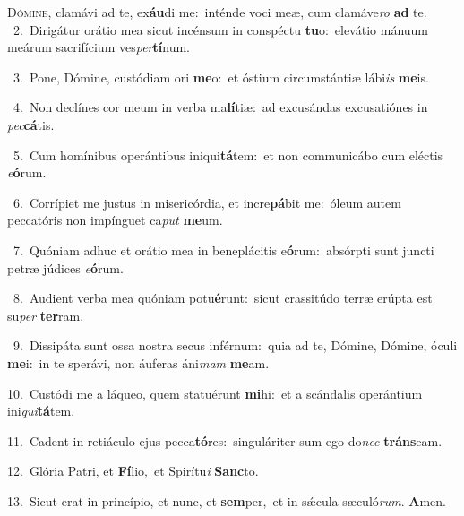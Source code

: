 \lettrine{\initial\textcolor{\initialcolor}{D}}{ómine,} clamávi ad te, ex\-\textbf{áu}\-di me:~\star inténde voci meæ, cum clamáve\textit{ro} \textbf{ad} te.\\
{\numbfont\textcolor{\numbcolor}{~2.}}~Dirigátur orátio mea sicut incénsum in conspéctu \textbf{tu}\-o:~\star elevátio mánuum meárum sacrifícium ves\-\textit{per}\-\textbf{tí}num.\par
{\numbfont\textcolor{\numbcolor}{~3.}}~Pone, Dómine, custódiam ori \textbf{me}\-o:~\star et óstium circumstántiæ lábi\textit{is} \textbf{me}\-is.\par
{\numbfont\textcolor{\numbcolor}{~4.}}~Non declínes cor meum in verba ma\-\textbf{lí}\-tiæ:~\star ad excusándas excusatiónes in \textit{pec}\-\textbf{cá}tis.\par
{\numbfont\textcolor{\numbcolor}{~5.}}~Cum homínibus operántibus iniqui\-\textbf{tá}\-tem:~\star et non communicábo cum eléctis \textit{e}\-\textbf{ó}rum.\par
{\numbfont\textcolor{\numbcolor}{~6.}}~Corrípiet me justus in misericórdia, et incre\-\textbf{pá}\-bit me:~\star óleum autem peccatóris non impínguet ca\textit{put} \textbf{me}\-um.\par
{\numbfont\textcolor{\numbcolor}{~7.}}~Quóniam adhuc et orátio mea in beneplácitis e\-\textbf{ó}\-rum:~\star absórpti sunt juncti petræ júdices \textit{e}\-\textbf{ó}rum.\par
{\numbfont\textcolor{\numbcolor}{~8.}}~Audient verba mea quóniam potu\-\textbf{é}\-runt:~\star sicut crassitúdo terræ erúpta est su\textit{per} \textbf{ter}\-ram.\par
{\numbfont\textcolor{\numbcolor}{~9.}}~Dissipáta sunt ossa nostra secus inférnum:~\dagger quia ad te, Dómine, Dómine, óculi \textbf{me}\-i:~\star in te sperávi, non áuferas áni\textit{mam} \textbf{me}\-am.\par
{\numbfont\textcolor{\numbcolor}{10.}}~Custódi me a láqueo, quem statuérunt \textbf{mi}\-hi:~\star et a scándalis operántium ini\-\textit{qui}\-\textbf{tá}tem.\par
{\numbfont\textcolor{\numbcolor}{11.}}~Cadent in retiáculo ejus pecca\-\textbf{tó}\-res:~\star singuláriter sum ego do\textit{nec} \textbf{tráns}\-eam.\par
{\numbfont\textcolor{\numbcolor}{12.}}~Glória Patri, et \textbf{Fí}\-lio,~\star et Spirítu\textit{i} \textbf{Sanc}\-to.\par
{\numbfont\textcolor{\numbcolor}{13.}}~Sicut erat in princípio, et nunc, et \textbf{sem}\-per,~\star et in sǽcula sæculó\-\textit{rum}\-. \textbf{A}\-men.\par
